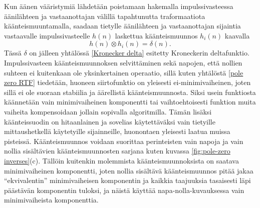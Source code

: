 \documentclass[finnish,12pt]{article}
\begin{document}


Kun äänen vääristymiä lähdetään poistamaan hakemalla impulssivasteessa äänilähteen ja vastaanottajan välillä tapahtunutta traformaatiota käänteismuuntamalla, saadaan tietylle äänilähteen ja vastaanottajan sijaintia vastaavalle impulssivasteelle $h(n)$ laskettua käänteismuunnos $h_i(n)$ kaavalla \begin{equation} \label{pole-zero delta}
h(n) \otimes h_i(n) = \delta(n).
\end{equation} Tässä $\delta$ on jälleen yhtälössä \eqref{Kronecker delta} esitetty Kroneckerin deltafunktio. Impulssivasteen käänteismuunnoksen selvittäminen sekä napojen, että nollien suhteen ei kuitenkaan ole yksinkertainen operaatio, sillä kuten yhtälöstä \eqref{pole zero RTF} tiedetään, huoneen siirtofunktio on yleisesti ei-minimivaiheinen, joten sillä ei ole suoraan stabiilia ja äärellistä käänteismuunnosta. Siksi usein funktiosta käännetään vain minimivaiheinen komponentti tai vaihtoehtoisesti funktion muita vaiheita kompensoidaan jollain sopivalla algoritmilla. Tämän lisäksi käänteissuodin on hitaanlainen ja sovelias käytettäväksi vain tietyille mittaushetkellä käytetyille sijainneille, huonontaen yleisesti laatua muissa pisteissä. Käänteismuunnos voidaan suorittaa perinteisten vain napoja ja vain nollia sisältävien käänteismuunnosten sarjana kuten kuvassa \ref{fig:pole-zero inverses}(c). Tällöin kuitenkin molemmista käänteismuunnoksista on saatava minimivaiheinen komponentti, joten nollia sisältävä käänteismuunnos pitää jakaa ``ekvivalentin'' minimivaiheisen komponentin ja kaikkia taajuuksia tasaisesti läpi päästävän komponentin tuloksi, ja näistä käyttää napa-nolla-kuvauksessa vain minimivaiheista komponenttia. \cite{Mourjopoulos1991} 
\end{document}
